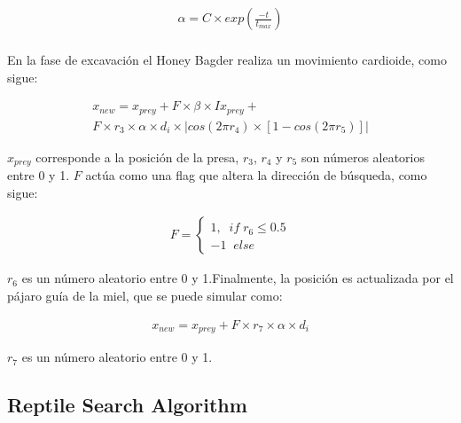 \documentclass[conference]{IEEEtran}
\begin{document}
\begin{equation}
\begin{gathered}
\alpha = C \times exp (\frac{-t}{t_{max}})\\
\end{gathered}
\label{eq29}
\end{equation}

\noindent En la fase de excavación el Honey Bagder realiza un movimiento cardioide, como sigue:

\begin{equation}
\begin{gathered}
x_{new}=x_{prey}+F \times \beta \times I x_{prey} + \\
F \times r_3 \times \alpha \times d_i  \times |cos(2\pi r_4) \times [1-cos(2\pi r_5)]|
\end{gathered}
\label{eq30}
\end{equation}

\noindent $x_{prey}$ corresponde a la posición de la presa, $r_3$, $r_4$ y $r_5$ son números aleatorios entre 0 y 1. $F$ actúa como una flag que altera la dirección de búsqueda, como sigue:

\begin{equation}
\begin{gathered}
F=
\begin{cases}
1, \; \; if \; r_6 \leq 0.5 \\
-1 \; \; else
\end{cases}
\end{gathered}
\label{eq31}
\end{equation}    

\noindent $r_6$ es un número aleatorio entre 0 y 1.Finalmente, la posición es actualizada por el pájaro guía de la miel, que se puede simular como:

\begin{equation}
\begin{gathered}
x_{new}=x_{prey}+F\times r_7\times \alpha \times d_i
\end{gathered}
\label{eq32}
\end{equation}

\noindent $r_7$ es un número aleatorio entre 0 y 1.

\subsection{Reptile Search Algorithm}
\end{document}
